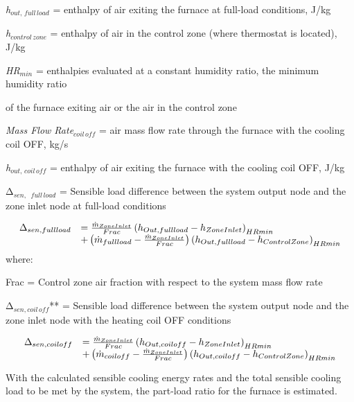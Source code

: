 \emph{h\(_{out,\, full\, load}\)} = enthalpy of air exiting the furnace at full-load conditions, J/kg

\emph{h\(_{control\, zone}\)} = enthalpy of air in the control zone (where thermostat is located), J/kg

\emph{HR\(_{min}\)} = enthalpies evaluated at a constant humidity ratio, the minimum humidity ratio

of the furnace exiting air or the air in the control zone

\emph{Mass Flow Rate\(_{coil\, off}\)} = air mass flow rate through the furnace with the cooling coil OFF, kg/s

\emph{h\(_{out,\, coil\, off}\)} = enthalpy of air exiting the furnace with the cooling coil OFF, J/kg

Δ\(_{sen,}\) \emph{\(_{full\, load}\)} = Sensible load difference between the system output node and the zone inlet node at full-load conditions

\begin{equation}
  \begin{array}{rl}
    \Delta_{sen,full load} &= \frac{\dot{m}_{ZoneInlet}}{Frac} \PB{h_{Out,full load} - h_{ZoneInlet}}_{HRmin} \\
                           &+ \PB{\dot{m}_{full load} - \frac{\dot{m}_{ZoneInlet}}{Frac}} \PB{h_{Out,full load} - h_{ControlZone}}_{HRmin}
  \end{array}
\end{equation}
where:

Frac = Control zone air fraction with respect to the system mass flow rate

Δ\(_{sen,coil\, off}\)** = Sensible load difference between the system output node and the zone inlet node with the heating coil OFF conditions

\begin{equation}
  \begin{array}{rl}
    \Delta_{sen,coil off} &= \frac{\dot{m}_{ZoneInlet}}{Frac} \PB{h_{Out,coil off} - h_{ZoneInlet}}_{HRmin} \\
                           &+ \PB{\dot{m}_{coil off} - \frac{\dot{m}_{ZoneInlet}}{Frac}} \PB{h_{Out,coil off} - h_{ControlZone}}_{HRmin}
  \end{array}
\end{equation}

With the calculated sensible cooling energy rates and the total sensible cooling load to be met by the system, the part-load ratio for the furnace is estimated.

